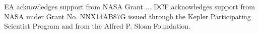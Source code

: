 \documentclass[graybox,natbib,nosecnum]{svmult}
\begin{document}




%


\begin{acknowledgement}
EA acknowledges support from NASA Grant ...  DCF acknowledges support from NASA under Grant No. NNX14AB87G issued through the Kepler Participating Scientist Program and from the Alfred P. Sloan Foundation.
\end{acknowledgement}

\end{document}

